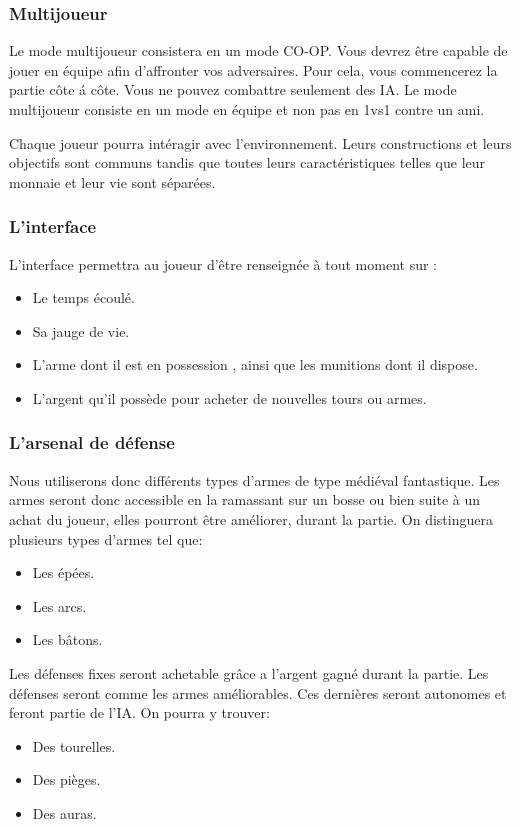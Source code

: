 \documentclass[a4paper, 12pt]{article}
\begin{document}
		\subsubsection{Multijoueur}
		Le mode multijoueur consistera en un mode CO-OP. Vous devrez \^etre capable de jouer en \'equipe afin d'affronter vos adversaires. Pour cela, vous commencerez la partie c\^ote \'a c\^ote. Vous ne pouvez combattre seulement des IA. Le mode multijoueur consiste en un mode en \'equipe et non pas en 1vs1 contre un ami.
		\par Chaque joueur pourra int\'eragir avec l'environnement. Leurs constructions et leurs objectifs sont communs tandis que toutes leurs caract\'eristiques telles que leur monnaie et leur vie sont s\'epar\'ees.
		\subsubsection{L'interface}
		L’interface permettra au joueur d'être renseignée à tout moment sur : 
		\begin{itemize}
		\item Le temps écoulé.
		\item Sa jauge de vie.
		\item L’arme dont il est en possession , ainsi que les  munitions dont il dispose.
		\item L’argent qu’il possède pour acheter de nouvelles tours ou armes.
		\end{itemize}
		\subsubsection{L'arsenal de défense}
		Nous utiliserons donc différents types d’armes de type médiéval fantastique.
Les armes seront donc accessible en la ramassant sur un bosse ou bien  suite à un achat du joueur, elles pourront être améliorer, durant la partie. On distinguera plusieurs types d’armes tel que:
	\begin{itemize}
	\item Les épées.
	\item Les arcs.
	\item Les bâtons.
	\end{itemize}
Les défenses fixes seront achetable grâce a l’argent gagné durant la partie. Les défenses seront comme les armes améliorables. Ces dernières seront autonomes et feront partie de l’IA. On pourra y trouver:
	\begin{itemize}
	\item Des tourelles.
	\item Des pièges.
	\item Des auras.
	\end{itemize}
\newpage
\end{document}
